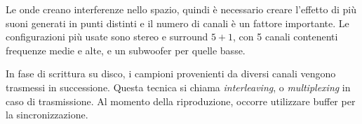 Le onde creano interferenze nello spazio, quindi è necessario creare l'effetto di più suoni generati in punti distinti e il numero di canali è un fattore importante. Le configurazioni più usate sono stereo e surround $5 + 1$, con 5 canali contenenti frequenze medie e alte, e un subwoofer per quelle basse. 

In fase di scrittura su disco, i campioni provenienti da diversi canali vengono trasmessi in successione. Questa tecnica si chiama \textit{interleaving}, o \textit{multiplexing} in caso di trasmissione. Al momento della riproduzione, occorre utilizzare buffer per la sincronizzazione.
